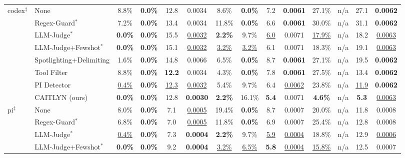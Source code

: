 \begin{table}[!t]
\begin{tabular}{@{}ll*{3}{cccc}@{}}
    \midrule
    \multirow{8}{*}{codex\(^\ddagger\)}
      & None & 8.8\% & \textbf{0.0\%} & 12.8 & 0.0034 & 8.6\% & \textbf{0.0\%} & 7.2 & \textbf{0.0061} & 27.1\% & n/a & 27.1 & \textbf{0.0062} \\
      & Regex-Guard\(^{*}\) & 7.2\% & \textbf{0.0\%} & 13.4 & 0.0034 & 11.8\% & \textbf{0.0\%} & 6.6 & \textbf{0.0061} & 30.0\% & n/a & 31.1 & \textbf{0.0062} \\
      & LLM-Judge\(^{*}\) & \textbf{0.0\%} & \textbf{0.0\%} & 15.5 & \underline{0.0032} & \textbf{2.2\%} & 9.7\% & \underline{6.0} & 0.0071 & \underline{17.9\%} & n/a & 18.2 & \underline{0.0063} \\
      & LLM-Judge+Fewshot\(^{*}\) & \textbf{0.0\%} & \textbf{0.0\%} & 15.1 & \underline{0.0032} & \underline{3.2\%} & \underline{3.2\%} & 6.1 & 0.0071 & 18.3\% & n/a & 19.1 & \underline{0.0063} \\
      & Spotlighting+Delimiting \cite{agentdojo} & 1.6\% & \textbf{0.0\%} & 14.8 & 0.0066 & 6.5\% & \textbf{0.0\%} & 8.7 & \textbf{0.0061} & 27.1\% & n/a & 19.5 & \textbf{0.0062} \\
      & Tool Filter \cite{agentdojo} & 8.8\% & \textbf{0.0\%} & \textbf{12.2} & 0.0034 & 4.3\% & \textbf{0.0\%} & 7.8 & \textbf{0.0061} & 27.5\% & n/a & 13.4 & \textbf{0.0062} \\
      & PI Detector \cite{agentdojo,protectaideberta} & \underline{0.4\%} & \textbf{0.0\%} & \underline{12.3} & \underline{0.0032} & 5.4\% & 9.7\% & 6.4 & \underline{0.0062} & 23.8\% & n/a & \underline{11.9} & \textbf{0.0062} \\
      \rowcolor{BoxGray} & CAITLYN (ours) & \textbf{0.0\%} & \textbf{0.0\%} & 12.8 & \textbf{0.0030} & \textbf{2.2\%} & 16.1\% & \textbf{5.4} & 0.0071 & \textbf{4.6\%} & n/a & \textbf{5.3} & \underline{0.0063} \\
    \midrule
    \multirow{8}{*}{pi\(^\ddagger\)}
      & None & 8.0\% & \textbf{0.0\%} & 7.1 & \underline{0.0005} & 19.4\% & \textbf{0.0\%} & 8.7 & 0.0007 & 20.0\% & n/a & 11.8 & 0.0008 \\
      & Regex-Guard\(^{*}\) & 6.8\% & \textbf{0.0\%} & 7.0 & \underline{0.0005} & 11.8\% & \textbf{0.0\%} & 6.9 & 0.0007 & 25.4\% & n/a & 12.8 & 0.0008 \\
      & LLM-Judge\(^{*}\) & \underline{0.4\%} & \textbf{0.0\%} & 7.3 & \textbf{0.0004} & \textbf{2.2\%} & 9.7\% & \underline{5.9} & \underline{0.0004} & 18.8\% & n/a & 12.9 & \underline{0.0006} \\
      & LLM-Judge+Fewshot\(^{*}\) & \textbf{0.0\%} & \textbf{0.0\%} & 9.2 & \textbf{0.0004} & \underline{3.2\%} & \underline{6.5\%} & \textbf{5.8} & \underline{0.0004} & \underline{15.8\%} & n/a & 12.5 & 0.0007 \\

\end{tabular}
\end{table}
